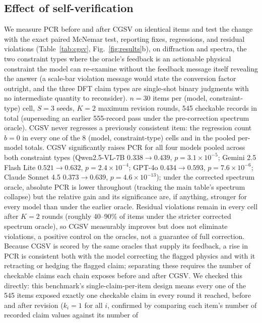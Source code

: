 \documentclass[pdflatex,sn-nature]{sn-jnl}
\begin{document}
\subsection*{Effect of self-verification}
We measure PCR before and after CGSV on identical items and test the change with the
exact paired McNemar test, reporting fixes, regressions, and residual violations
(Table~\ref{tab:cgsv}, Fig.~\ref{fig:results}b), on diffraction and spectra, the two constraint types where
the oracle's feedback is an actionable physical constraint the model can re-examine
without the feedback message itself revealing the answer (a scale-bar violation
message would state the conversion factor outright, and the three DFT claim types are
single-shot binary judgments with no intermediate quantity to reconsider). $n=30$
items per (model, constraint-type) cell, $S=3$ seeds, $K=2$ maximum revision rounds, 545
checkable records in total (superseding an earlier 555-record pass under the
pre-correction spectrum oracle). CGSV never regresses a previously consistent item: the
regression count $b=0$ in every one of the 8 (model, constraint-type) cells and in the
pooled per-model totals. CGSV significantly raises PCR for all four models pooled across both
constraint types (Qwen2.5-VL-7B $0.338\!\to\!0.439$, $p=3.1\times10^{-5}$; Gemini 2.5
Flash Lite $0.521\!\to\!0.632$, $p=2.4\times10^{-4}$; GPT-4o
$0.434\!\to\!0.593$, $p=7.6\times10^{-6}$; Claude Sonnet 4.5 $0.373\!\to\!0.639$,
$p=4.6\times10^{-13}$); under the corrected spectrum oracle, absolute PCR is lower
throughout (tracking the main table's spectrum collapse) but the relative gain and its
significance are, if anything, stronger for every model than under the earlier oracle.
Residual violations remain in every cell after $K=2$ rounds (roughly 40--90\% of
items under the stricter corrected spectrum oracle), so CGSV measurably improves but does not eliminate violations, a positive
control on the oracles, not a guarantee of full correction.
Because CGSV is scored by the same oracles that supply its feedback, a rise in PCR is
consistent both with the model correcting the flagged physics and with it retracting or
hedging the flagged claim; separating these requires the number of checkable claims each
chain exposes before and after CGSV. We checked this directly: this benchmark's
single-claim-per-item design means every one of the 545 items exposed exactly one
checkable claim in every round it reached, before and after revision ($k_i=1$ for all $i$,
confirmed by comparing each item's number of recorded claim values against its number of
\end{document}
